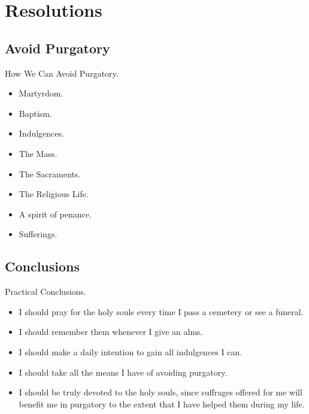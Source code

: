 \documentclass{beamer}
\begin{document}
\section{Resolutions}

\subsection{Avoid Purgatory}

\begin{frame}{How We Can Avoid Purgatory.}
\begin{itemize}
 \item Martyrdom.
 \item Baptism.
 \item Indulgences.
 \item The Mass.
 \item The Sacraments.
 \item The Religious Life.
 \item A spirit of penance.
 \item Sufferings.
\end{itemize}
\end{frame}

\subsection{Conclusions}

\begin{frame}{Practical Conclusions.}
\begin{itemize}
\item I should pray for the holy souls every time I pass a cemetery or  see  a
   funeral.


\item I should remember them whenever I give an alms.


\item I should make a daily intention to gain all indulgences I can.


\item I should take all the means I have of avoiding purgatory.


\item I should be truly devoted to the holy souls, since suffrages offered for
   me will benefit me in purgatory to the extent that I  have  helped  them
   during my life.
\end{itemize}
\end{frame}
\end{document}
